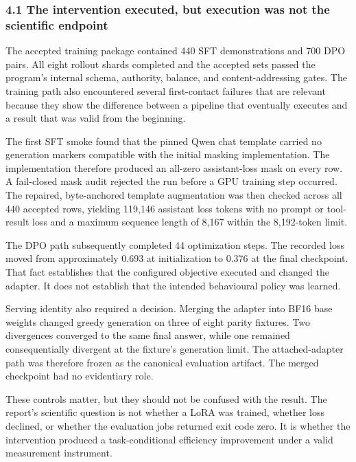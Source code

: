 \documentclass[
  9pt,
  letterpaper,
]{article}
\begin{document}
\hypertarget{41-the-intervention-executed-but-execution-was-not-the-scientific-endpoint}{%
\subsubsection{4.1 The intervention executed, but execution was not the
scientific
endpoint}\label{41-the-intervention-executed-but-execution-was-not-the-scientific-endpoint}}

The accepted training package contained 440 SFT demonstrations and 700
DPO pairs. All eight rollout shards completed and the accepted sets
passed the program's internal schema, authority, balance, and
content-addressing gates. The training path also encountered several
first-contact failures that are relevant because they show the
difference between a pipeline that eventually executes and a result that
was valid from the beginning.

The first SFT smoke found that the pinned Qwen chat template carried no
generation markers compatible with the initial masking implementation.
The implementation therefore produced an all-zero assistant-loss mask on
every row. A fail-closed mask audit rejected the run before a GPU
training step occurred. The repaired, byte-anchored template
augmentation was then checked across all 440 accepted rows, yielding
119,146 assistant loss tokens with no prompt or tool-result loss and a
maximum sequence length of 8,167 within the 8,192-token limit.

The DPO path subsequently completed 44 optimization steps. The recorded
loss moved from approximately 0.693 at initialization to 0.376 at the
final checkpoint. That fact establishes that the configured objective
executed and changed the adapter. It does not establish that the
intended behavioural policy was learned.

Serving identity also required a decision. Merging the adapter into BF16
base weights changed greedy generation on three of eight parity
fixtures. Two divergences converged to the same final answer, while one
remained consequentially divergent at the fixture's generation limit.
The attached-adapter path was therefore frozen as the canonical
evaluation artifact. The merged checkpoint had no evidentiary role.

These controls matter, but they should not be confused with the result.
The report's scientific question is not whether a LoRA was trained,
whether loss declined, or whether the evaluation jobs returned exit code
zero. It is whether the intervention produced a task-conditional
efficiency improvement under a valid measurement instrument.
\end{document}
